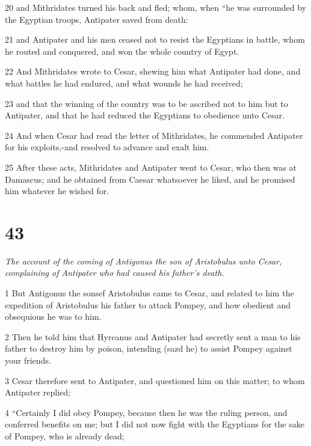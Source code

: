\par 20 and Mithridates turned his back and fled; whom, when “he was surrounded by the Egyptian troops, Antipater saved from death: 

\par 21 and Antipater and his men ceased not to resist the Egyptians in battle, whom he routed and conquered, and won the whole country of Egypt. 

\par 22 And Mithridates wrote to Cesar, shewing him what Antipater had done, and what battles he had endured, and what wounds he had received; 

\par 23 and that the winning of the country was to be ascribed not to him but to Antipater, and that he had reduced the Egyptians to obedience unto Cesar. 

\par 24 And when Cesar had read the letter of Mithridates, he commended Antipater for his exploits,-and resolved to advance and exalt him. 

\par 25 After these acts, Mithridates and Antipater went to Cesar, who then was at Damascus; and he obtained from Caesar whatsoever he liked, and he promised him whatever he wished for. 

\chapter{43}

\par \textit{The account of the coming of Antigonus the son of Aristobulus unto Cesar, complaining of Antipater who had caused his father’s death.}

\par 1 But Antigonus the sonsef Aristobulus came to Cesar, and related to him the expedition of Aristobulus his father to attack Pompey, and how obedient and obsequious he was to him. 

\par 2 Then he told him that Hyrcanus and Antipater had secretly sent a man to his father to destroy him by poison, intending (sazd he) to assist Pompey against your friends. 

\par 3 Cesar therefore sent to Antipater, and questioned him on this matter; to whom Antipater replied; 

\par 4 “Certainly I did obey Pompey, because then he was the ruling person, and conferred benefits on me; but I did not now fight with the Egyptians for the sake of Pompey, who is already dead; 

